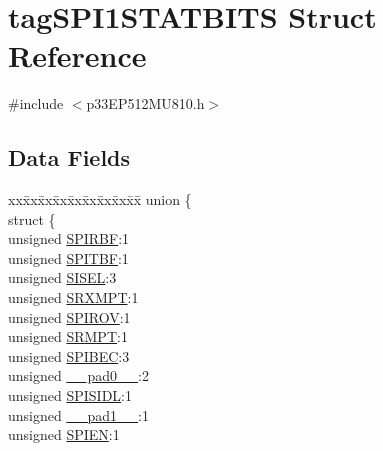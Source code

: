 \hypertarget{structtag_s_p_i1_s_t_a_t_b_i_t_s}{}\section{tag\+S\+P\+I1\+S\+T\+A\+T\+B\+I\+TS Struct Reference}
\label{structtag_s_p_i1_s_t_a_t_b_i_t_s}


{\ttfamily \#include $<$p33\+E\+P512\+M\+U810.\+h$>$}

\subsection*{Data Fields}
\begin{DoxyCompactItemize}
\item 
\begin{tabbing}
xx\=xx\=xx\=xx\=xx\=xx\=xx\=xx\=xx\=\kill
union \{\\
\>struct \{\\
\>\>unsigned \hyperlink{structtag_s_p_i1_s_t_a_t_b_i_t_s_aca81e0734a11061cfacfc4eeab87e4e9}{SPIRBF}:1\\
\>\>unsigned \hyperlink{structtag_s_p_i1_s_t_a_t_b_i_t_s_ad0edcfb75c96ed94138b2b1995ca0a91}{SPITBF}:1\\
\>\>unsigned \hyperlink{structtag_s_p_i1_s_t_a_t_b_i_t_s_a0aae6d6bf32c0591c0771f0947256bbc}{SISEL}:3\\
\>\>unsigned \hyperlink{structtag_s_p_i1_s_t_a_t_b_i_t_s_ac20c62c315f5e27133de699867a5072e}{SRXMPT}:1\\
\>\>unsigned \hyperlink{structtag_s_p_i1_s_t_a_t_b_i_t_s_a53721ff21767e781162f289a006cad5f}{SPIROV}:1\\
\>\>unsigned \hyperlink{structtag_s_p_i1_s_t_a_t_b_i_t_s_a4682f59fe87ae9344722baf5b4e0ab97}{SRMPT}:1\\
\>\>unsigned \hyperlink{structtag_s_p_i1_s_t_a_t_b_i_t_s_a2e2480d221f198907a6594dd78a2a234}{SPIBEC}:3\\
\>\>unsigned \hyperlink{structtag_s_p_i1_s_t_a_t_b_i_t_s_adf71f3d8410c1f1dbbc96680a92c49af}{\_\_pad0\_\_}:2\\
\>\>unsigned \hyperlink{structtag_s_p_i1_s_t_a_t_b_i_t_s_a73d48e3f46331c0141085ce1b20bcda4}{SPISIDL}:1\\
\>\>unsigned \hyperlink{structtag_s_p_i1_s_t_a_t_b_i_t_s_acaf2d0924a107ec6e8d2e31febaf66f9}{\_\_pad1\_\_}:1\\
\>\>unsigned \hyperlink{structtag_s_p_i1_s_t_a_t_b_i_t_s_abfc32d788a158c98350adfdd625de985}{SPIEN}:1\\

\end{tabbing}
\end{DoxyCompactItemize}
